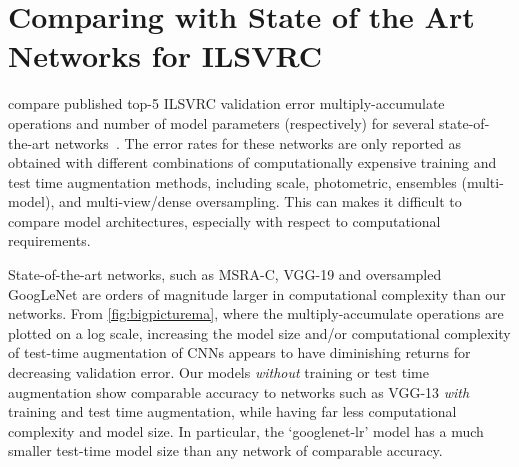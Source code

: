\documentclass[thesis]{subfiles}
\begin{document}
    \section{Comparing with State of the Art Networks for ILSVRC}
     compare published top-5 ILSVRC validation error \vs multiply-accumulate operations and number of model parameters (respectively) for several state-of-the-art networks~\citep{Simonyan2014verydeep,Szegedy2014going,He2015b}. The error rates for these networks are only reported as obtained with different combinations of computationally expensive training and test time augmentation methods, including scale, photometric, ensembles (multi-model), and multi-view/dense oversampling. This can makes it difficult to compare model architectures, especially with respect to computational requirements.
    
    State-of-the-art networks, such as MSRA-C, VGG-19 and oversampled GoogLeNet are orders of magnitude larger in computational complexity than our networks. From \cref{fig:bigpicturema}, where the multiply-accumulate operations are plotted on a log scale, increasing the model size and/or computational complexity of test-time augmentation of CNNs appears to have diminishing returns for decreasing validation error. Our models \emph{without} training or test time augmentation show comparable accuracy to networks such as VGG-13 \emph{with} training and test time augmentation, while having far less computational complexity and model size. In particular, the `googlenet-lr' model has a much smaller test-time model size than any network of comparable accuracy. 
    
\end{document}
